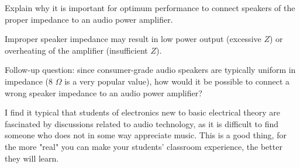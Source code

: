 

Explain why it is important for optimum performance to connect speakers of the proper impedance to an audio power amplifier.







Improper speaker impedance may result in low power output (excessive $Z$) or overheating of the amplifier (insufficient $Z$).

\vskip 10pt

Follow-up question: since consumer-grade audio speakers are typically uniform in impedance (8 $\Omega$ is a very popular value), how would it be possible to connect a wrong speaker impedance to an audio power amplifier?







I find it typical that students of electronics new to basic electrical theory are fascinated by discussions related to audio technology, as it is difficult to find someone who does not in some way appreciate music.  This is a good thing, for the more "real" you can make your students' classroom experience, the better they will learn.





